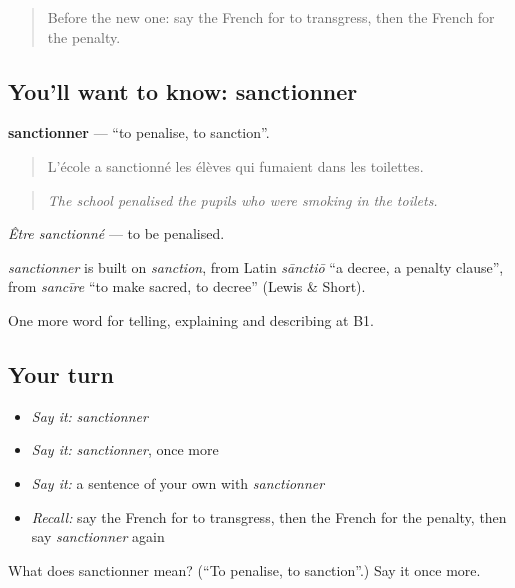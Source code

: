 \label{lesson:FR-C382-sanctionner}



\begin{quote}
Before the new one: say the French for to transgress, then the French for the penalty.
\end{quote}

\subsection*{You'll want to know: sanctionner}
\textbf{sanctionner} — \textquotedblleft{}to penalise, to sanction\textquotedblright{}.

\begin{quote}
L'école a sanctionné les élèves qui fumaient dans les toilettes.
\end{quote}

\begin{quote}
\emph{The school penalised the pupils who were smoking in the toilets.}
\end{quote}

\emph{Être sanctionné} — to be penalised.

\begin{cousinweb}
\emph{sanctionner} is built on \emph{sanction}, from Latin \emph{sānctiō} \textquotedblleft{}a decree, a penalty clause\textquotedblright{}, from \emph{sancīre} \textquotedblleft{}to make sacred, to decree\textquotedblright{} (Lewis \& Short).
\end{cousinweb}

\begin{grammarlens}[title={What you've built}]
One more word for telling, explaining and describing at B1.
\end{grammarlens}

\subsection*{Your turn}
\begin{itemize}
\raggedright
  \item \emph{Say it:} \emph{sanctionner}
  \item \emph{Say it:} \emph{sanctionner}, once more
  \item \emph{Say it:} a sentence of your own with \emph{sanctionner}
  \item \emph{Recall:} say the French for to transgress, then the French for the penalty, then say \emph{sanctionner} again
\end{itemize}

\begin{tcolorbox}[breakable,colback=teal!4,colframe=teal!35!black,title={Before you move on}]
What does sanctionner mean? (\textquotedblleft{}To penalise, to sanction\textquotedblright{}.) Say it once more.
\end{tcolorbox}
